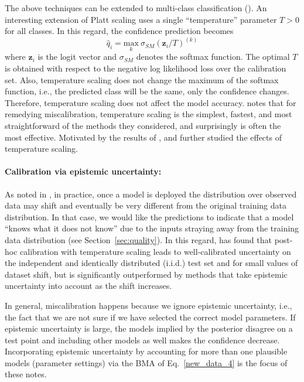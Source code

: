The above techniques can be extended to multi-class classification (\cite{guo2017calibration}). 
An interesting extension of Platt scaling uses a single ``temperature'' parameter $T>0$ for all classes. 
In this regard, the confidence prediction becomes 
\begin{equation}
\hat{q}_i = \underset{k}{\mathrm{max}}~\sigma_{SM}(\boldsymbol{z}_i/T)^{(k)}
\end{equation}
where $\boldsymbol{z}_i$ is the logit vector and $\sigma_{SM}$ denotes the softmax function.
The optimal $T$ is obtained with respect to the negative log likelihood loss over the calibration set. 
Also, temperature scaling does not change the maximum of the softmax function, i.e., the predicted class will be the same, only the confidence changes. 
Therefore, temperature scaling does not affect the model accuracy. 
\textcite{guo2017calibration} notes that for remedying miscalibration, temperature scaling is the simplest, fastest, and most straightforward of the methods they considered, and surprisingly is often the most effective.
Motivated by the results of \textcite{guo2017calibration}, \textcite{wenzel2020how} and \textcite{wilson2020bayesian} further studied the effects of temperature scaling.

\paragraph{Calibration via epistemic uncertainty:}
As noted in \textcite{ovadia2019can}, in practice, once a model is deployed the distribution over observed data may shift and eventually be very different from the original training data distribution.
In that case, we would like the predictions to indicate that a model ``knows what it does not know'' due to the inputs straying away from the training data distribution (see Section~\ref{sec:quality}).
In this regard, \textcite{ovadia2019can} has found that post-hoc calibration with temperature scaling leads to well-calibrated uncertainty on the independent and identically distributed (i.i.d.) test set and for small values of dataset shift, but is significantly outperformed by methods that take epistemic uncertainty into account as the shift increases.

In general, miscalibration happens because we ignore epistemic uncertainty, i.e., the fact that we are not sure if we have selected the correct model parameters. 
If epistemic uncertainty is large, the models implied by the posterior disagree on a test point and including other models as well makes the confidence decrease.
Incorporating epistemic uncertainty by accounting for more than one plausible models (parameter settings) via the BMA of Eq.~\eqref{new_data_4} is the focus of these notes. 

